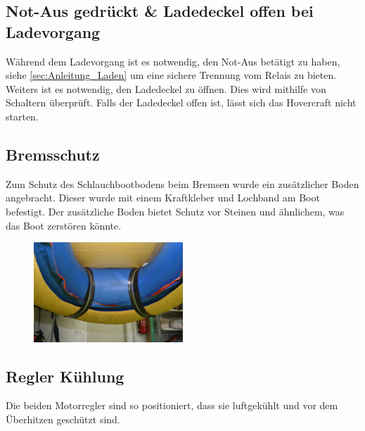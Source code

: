 \subsection{Not-Aus gedrückt \& Ladedeckel offen bei Ladevorgang}
Während dem Ladevorgang ist es notwendig, den Not-Aus betätigt zu haben, siehe \ref{sec:Anleitung_Laden} um eine sichere Trennung vom Relais zu bieten. \\
Weiters ist es notwendig, den Ladedeckel zu öffnen. Dies wird mithilfe von Schaltern überprüft. Falls der Ladedeckel offen ist, lässt sich das Hovercraft nicht starten.

\subsection{Bremsschutz}
Zum Schutz des Schlauchbootbodens beim Bremsen wurde ein zusätzlicher Boden angebracht. Dieser wurde mit einem Kraftkleber und Lochband am Boot befestigt. 
Der zusätzliche Boden bietet Schutz vor Steinen und ähnlichem, was das Boot zerstören könnte. 

\begin{figure}[h]
    \centering
    \includegraphics[width=0.5\textwidth]{Fotos/Bodenschutz.jpg}
\end{figure}


\subsection{Regler Kühlung}
Die beiden Motorregler sind so positioniert, dass sie luftgekühlt und vor dem Überhitzen geschützt sind. 

